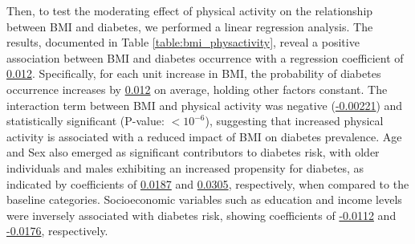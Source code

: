 \documentclass[11pt]{article}
\begin{document}
Then, to test the moderating effect of physical activity on the relationship between BMI and diabetes, we performed a linear regression analysis. The results, documented in Table \ref{table:bmi_physactivity}, reveal a positive association between BMI and diabetes occurrence with a regression coefficient of \hyperlink{B2a}{0.012}. Specifically, for each unit increase in BMI, the probability of diabetes occurrence increases by \hyperlink{B2a}{0.012} on average, holding other factors constant. The interaction term between BMI and physical activity was negative (\hyperlink{B4a}{-0.00221}) and statistically significant (P-value: $<$\hyperlink{B4d}{$10^{-6}$}), suggesting that increased physical activity is associated with a reduced impact of BMI on diabetes prevalence. Age and Sex also emerged as significant contributors to diabetes risk, with older individuals and males exhibiting an increased propensity for diabetes, as indicated by coefficients of \hyperlink{B5a}{0.0187} and \hyperlink{B6a}{0.0305}, respectively, when compared to the baseline categories. Socioeconomic variables such as education and income levels were inversely associated with diabetes risk, showing coefficients of \hyperlink{B7a}{-0.0112} and \hyperlink{B8a}{-0.0176}, respectively.
\end{document}

